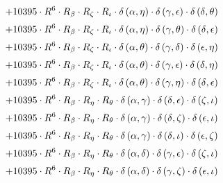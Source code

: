 \begin{subequations}
\begin{gather}
 \\[0.2em] \notag 		 + 10395 \cdot R^{6} \cdot R_{\beta{}} \cdot R_{\zeta{}} \cdot R_{\iota{}} \cdot \delta{}\left(\alpha{}, \eta{}\right) \cdot \delta{}\left(\gamma{}, \epsilon{}\right) \cdot \delta{}\left(\delta{}, \theta{}\right) 
 \\[0.2em] \notag 		 + 10395 \cdot R^{6} \cdot R_{\beta{}} \cdot R_{\zeta{}} \cdot R_{\iota{}} \cdot \delta{}\left(\alpha{}, \eta{}\right) \cdot \delta{}\left(\gamma{}, \theta{}\right) \cdot \delta{}\left(\delta{}, \epsilon{}\right) 
 \\[0.2em] \notag 		 + 10395 \cdot R^{6} \cdot R_{\beta{}} \cdot R_{\zeta{}} \cdot R_{\iota{}} \cdot \delta{}\left(\alpha{}, \theta{}\right) \cdot \delta{}\left(\gamma{}, \delta{}\right) \cdot \delta{}\left(\epsilon{}, \eta{}\right) 
 \\[0.2em] \notag 		 + 10395 \cdot R^{6} \cdot R_{\beta{}} \cdot R_{\zeta{}} \cdot R_{\iota{}} \cdot \delta{}\left(\alpha{}, \theta{}\right) \cdot \delta{}\left(\gamma{}, \epsilon{}\right) \cdot \delta{}\left(\delta{}, \eta{}\right) 
 \\[0.2em] \notag 		 + 10395 \cdot R^{6} \cdot R_{\beta{}} \cdot R_{\zeta{}} \cdot R_{\iota{}} \cdot \delta{}\left(\alpha{}, \theta{}\right) \cdot \delta{}\left(\gamma{}, \eta{}\right) \cdot \delta{}\left(\delta{}, \epsilon{}\right) 
 \\[0.2em] \notag 		 + 10395 \cdot R^{6} \cdot R_{\beta{}} \cdot R_{\eta{}} \cdot R_{\theta{}} \cdot \delta{}\left(\alpha{}, \gamma{}\right) \cdot \delta{}\left(\delta{}, \epsilon{}\right) \cdot \delta{}\left(\zeta{}, \iota{}\right) 
 \\[0.2em] \notag 		 + 10395 \cdot R^{6} \cdot R_{\beta{}} \cdot R_{\eta{}} \cdot R_{\theta{}} \cdot \delta{}\left(\alpha{}, \gamma{}\right) \cdot \delta{}\left(\delta{}, \zeta{}\right) \cdot \delta{}\left(\epsilon{}, \iota{}\right) 
 \\[0.2em] \notag 		 + 10395 \cdot R^{6} \cdot R_{\beta{}} \cdot R_{\eta{}} \cdot R_{\theta{}} \cdot \delta{}\left(\alpha{}, \gamma{}\right) \cdot \delta{}\left(\delta{}, \iota{}\right) \cdot \delta{}\left(\epsilon{}, \zeta{}\right) 
 \\[0.2em] \notag 		 + 10395 \cdot R^{6} \cdot R_{\beta{}} \cdot R_{\eta{}} \cdot R_{\theta{}} \cdot \delta{}\left(\alpha{}, \delta{}\right) \cdot \delta{}\left(\gamma{}, \epsilon{}\right) \cdot \delta{}\left(\zeta{}, \iota{}\right) 
 \\[0.2em] \notag 		 + 10395 \cdot R^{6} \cdot R_{\beta{}} \cdot R_{\eta{}} \cdot R_{\theta{}} \cdot \delta{}\left(\alpha{}, \delta{}\right) \cdot \delta{}\left(\gamma{}, \zeta{}\right) \cdot \delta{}\left(\epsilon{}, \iota{}\right) 

\end{gather}
\end{subequations}
